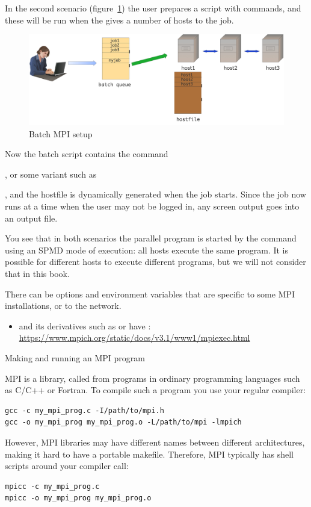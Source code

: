 In the second scenario (figure~\ref{fig:mpi-batch}) the user prepares
a  script with commands, and these will be
run when the  gives a number of hosts
to the job.
\begin{figure}[ht]
  \includegraphics[scale=.1]{graphics/mpi-batch}
  \caption{Batch MPI setup}
  \label{fig:mpi-batch}
\end{figure}
Now the batch script contains the  command%
\begin{istc}
, or some variant such as %
\end{istc}
, and the hostfile is dynamically generated when the job starts.
Since the job now runs at a time when the user may not be logged in, 
any screen output goes into an output file.

You see that in both scenarios the parallel program is started
by the  command using
an \ac{SPMD} mode of execution: all hosts execute the same program.
It is possible for different hosts to execute different programs,
but we will not consider that in this book.

There can be options and environment variables that are specific to
some MPI installations, or to the network.
\begin{itemize}
\item {} and its derivatives such as
   or  have
  :
  \url{https://www.mpich.org/static/docs/v3.1/www1/mpiexec.html}
\end{itemize}

 {Making and running an MPI program}

MPI is a library, called from programs in ordinary programming languages
such as C/C++ or Fortran. To compile such a program you use your regular
compiler:
\begin{verbatim}
gcc -c my_mpi_prog.c -I/path/to/mpi.h
gcc -o my_mpi_prog my_mpi_prog.o -L/path/to/mpi -lmpich
\end{verbatim}
However, MPI libraries may have different names between different
architectures, making it hard to have a portable makefile. Therefore,
MPI typically has shell scripts around your compiler call:
\begin{verbatim}
mpicc -c my_mpi_prog.c
mpicc -o my_mpi_prog my_mpi_prog.o
\end{verbatim}

